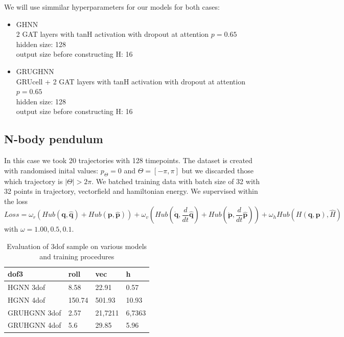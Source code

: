 We will use simmilar hyperparameters for our models for both cases:
\begin{itemize}
	\item GHNN\\ 
	2 GAT layers with tanH activation with dropout at attention $p=0.65$\\
	hidden size: 128\\
	output size before constructing H: 16
	\item GRUGHNN\\ 
	GRUcell + 2 GAT layers with tanH activation with dropout at attention $p=0.65$\\
	hidden size: 128\\
	output size before constructing H: 16
\end{itemize}

\subsection{N-body pendulum}
In this case we took 20 trajectories with 128 timepoints. The dataset is created with randomised inital values: $p_{\Theta} = 0$ and $\Theta =[-\pi,\pi]$ but we discarded those which trajectory is $|\Theta|>2\pi$. We batched training data with batch size of 32 with 32 points in trajectory, vectorfield and hamiltonian energy. We supervised within the loss
\begin{equation}
	Loss =  \omega_r(Hub({\mathbf{q}},\hat{\mathbf{q}}) + Hub({\mathbf{p}},\hat{\mathbf{p}})) +
	\omega_v(Hub(\dot{\mathbf{q}},\frac{d}{dt}\hat{\mathbf{q}}) + Hub(\dot{\mathbf{p}},\frac{d}{dt}\hat{\mathbf{p}})) +
	\omega_h Hub(H(\mathbf{q},\mathbf{p}),\hat{H}) 
\end{equation} with $\omega ={1.00,0.5,0.1}$.
\begin{table}[h!]
	\centering
	\caption{Evaluation of 3dof sample on various models and training procedures} %
	\label{tab:my_label}               %
	\begin{tabular}{|l|l|l|l|}
		\hline
		dof3 & roll & vec & h\\ 
		\hline
		HGNN 3dof & 8.58 & 22.91 & 0.57 \\  
		\hline
		HGNN 4dof & 150.74 & 501.93 & 10.93 \\  
		\hline
		GRUHGNN 3dof & 2.57 & 21,7211 & 6,7363 \\  
		\hline
		GRUHGNN 4dof & 5.6 & 29.85 & 5.96 \\  
		\hline
	\end{tabular}
\end{table}
